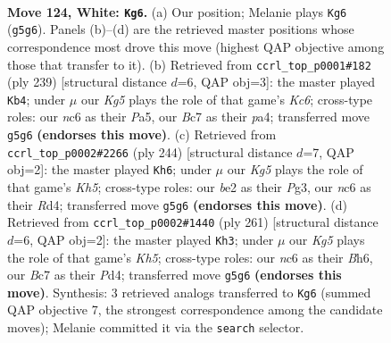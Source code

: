 \documentclass[11pt]{article}
\begin{document}
\clearpage

\begin{figure}[p]\centering
\begin{subfigure}{0.46\textwidth}\centering
\resizebox{\linewidth}{!}{%
\newchessgame
\chessboard[
  setfen={7k/2B5/2n5/5PK1/8/8/4b3/8 w - - 5 124},
  showmover=false,
  pgfstyle=straightmove, color=movearrow, markmove={g5-g6}
]}
\caption{}
\end{subfigure}\hfill
\begin{subfigure}{0.46\textwidth}\centering
\resizebox{\linewidth}{!}{%
\newchessgame
\chessboard[
  setfen={8/8/7K/p7/P7/2k5/Bp6/8 b - - 1 120},
  showmover=false,
  pgfstyle=straightmove, color=movearrow, markmove={c3-b4}
]}
\caption{}
\end{subfigure}
\\[4pt]
\begin{subfigure}{0.46\textwidth}\centering
\resizebox{\linewidth}{!}{%
\newchessgame
\chessboard[
  setfen={7k/1r6/8/6PK/3R4/6P1/8/8 w - - 41 123},
  showmover=false,
  pgfstyle=straightmove, color=movearrow, markmove={h5-h6}
]}
\caption{}
\end{subfigure}\hfill
\begin{subfigure}{0.46\textwidth}\centering
\resizebox{\linewidth}{!}{%
\newchessgame
\chessboard[
  setfen={8/8/2B4b/8/3p2pk/8/4K3/8 b - - 55 131},
  showmover=false,
  pgfstyle=straightmove, color=movearrow, markmove={h4-h3}
]}
\caption{}
\end{subfigure}
\caption{\textbf{Move 124, White: \texttt{Kg6}.} (a) Our position; Melanie plays \texttt{Kg6} (\texttt{g5g6}). Panels (b)--(d) are the retrieved master positions whose correspondence most drove this move (highest QAP objective among those that transfer to it). (b) Retrieved from \texttt{ccrl\_top\_p0001\#182} (ply 239) [structural distance $d$=6, QAP obj=3]: the master played \texttt{Kb4}; under $\mu$ our \emph{Kg5} plays the role of that game's \emph{Kc6}; cross-type roles: our \emph{n}c6 as their \emph{P}a5, our \emph{B}c7 as their \emph{p}a4; transferred move \texttt{g5g6} \textbf{(endorses this move)}. (c) Retrieved from \texttt{ccrl\_top\_p0002\#2266} (ply 244) [structural distance $d$=7, QAP obj=2]: the master played \texttt{Kh6}; under $\mu$ our \emph{Kg5} plays the role of that game's \emph{Kh5}; cross-type roles: our \emph{b}e2 as their \emph{P}g3, our \emph{n}c6 as their \emph{R}d4; transferred move \texttt{g5g6} \textbf{(endorses this move)}. (d) Retrieved from \texttt{ccrl\_top\_p0002\#1440} (ply 261) [structural distance $d$=6, QAP obj=2]: the master played \texttt{Kh3}; under $\mu$ our \emph{Kg5} plays the role of that game's \emph{Kh5}; cross-type roles: our \emph{n}c6 as their \emph{B}h6, our \emph{B}c7 as their \emph{P}d4; transferred move \texttt{g5g6} \textbf{(endorses this move)}. Synthesis: 3 retrieved analogs transferred to \texttt{Kg6} (summed QAP objective 7, the strongest correspondence among the candidate moves); Melanie committed it via the \texttt{search} selector.}
\label{fig:thought-m246}
\end{figure}
\end{document}
